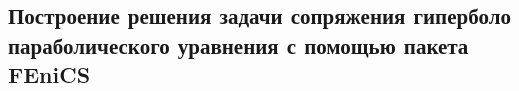 \subsection{Построение решения задачи сопряжения гиперболо параболического уравнения с помощью пакета FEniCS}
